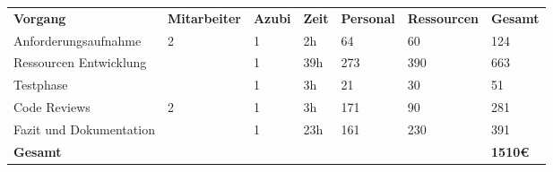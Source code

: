 \begin{tabu}{lllllll}
\rowfont{\bfseries\leavevmode\color{headingfont}}\textbf{Vorgang} & \textbf{Mitarbeiter} & \textbf{Azubi} & \textbf{Zeit} & \textbf{Personal} & \textbf{Ressourcen} & \textbf{Gesamt} \\
Anforderungsaufnahme & 2 & 1 & 2h & 64 & 60 & 124 \\
Ressourcen Entwicklung & \ & 1 & 39h & 273 & 390 & 663 \\ 
Testphase & \ & 1 & 3h & 21 & 30 & 51 \\
Code Reviews & 2 & 1 & 3h & 171 & 90 & 281 \\
Fazit und Dokumentation & \ & 1 & 23h & 161 & 230 & 391 \\
\hline
\hline
{}\textbf{Gesamt} & & & & & & \textbf{1510€} \\
\end{tabu}
